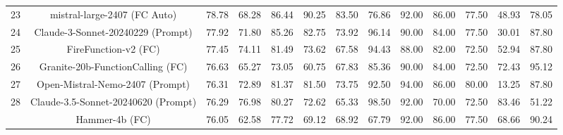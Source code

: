 \documentclass{article}
\begin{document}
\begin{table}[h]
{\begin{tabular}{ccccccccccccc}
23                     & mistral-large-2407 (FC Auto)                   & 78.78                         & 68.28  & 86.44    & 90.25    & 83.50                                                       & 76.86  & 92.00    & 86.00    & 77.50                                                       & 48.93                         & 78.05                       \\
24                     & Claude-3-Sonnet-20240229 (Prompt)              & 77.92                         & 71.80  & 85.26    & 82.75    & 73.92                                                       & 96.14  & 90.00    & 84.00    & 77.50                                                       & 30.01                         & 87.80                       \\
25                     & FireFunction-v2 (FC)                           & 77.45                         & 74.11  & 81.49    & 73.62    & 67.58                                                       & 94.43  & 88.00    & 82.00    & 72.50                                                       & 52.94                         & 87.80                       \\
26                     & Granite-20b-FunctionCalling (FC)               & 76.63                         & 65.27  & 73.05    & 60.75    & 67.83                                                       & 85.36  & 90.00    & 84.00    & 72.50                                                       & 72.43                         & 95.12                       \\
27                     & Open-Mistral-Nemo-2407 (Prompt)                & 76.31                         & 72.89  & 81.37    & 81.50    & 73.75                                                       & 92.50  & 94.00    & 86.00    & 80.00                                                       & 13.25                         & 87.80                       \\
28                     & Claude-3.5-Sonnet-20240620 (Prompt)            & 76.29                         & 76.98  & 80.27    & 72.62    & 65.33                                                       & 98.50  & 92.00    & 70.00    & 72.50                                                       & 83.46                         & 51.22                       \\
\rowcolor[HTML]{EFEFEF} 
                       & Hammer-4b (FC)                                 & 76.05                         & 62.58  & 77.72    & 69.12    & 68.92                                                       & 67.79  & 92.00    & 86.00    & 77.50                                                       & 68.66                         & 90.24                       \\

\end{tabular}}
\end{table}
\end{document}
